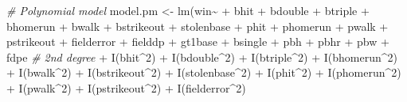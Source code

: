 \documentclass[
]{article}
\newenvironment{Shaded}{\begin{snugshade}}{\end{snugshade}}
\newcommand{\CommentTok}[1]{\textcolor[rgb]{0.56,0.35,0.01}{\textit{#1}}}
\newcommand{\DecValTok}[1]{\textcolor[rgb]{0.00,0.00,0.81}{#1}}
\newcommand{\FunctionTok}[1]{\textcolor[rgb]{0.00,0.00,0.00}{#1}}
\newcommand{\NormalTok}[1]{#1}
\newcommand{\OtherTok}[1]{\textcolor[rgb]{0.56,0.35,0.01}{#1}}
\newcommand{\SpecialCharTok}[1]{\textcolor[rgb]{0.00,0.00,0.00}{#1}}
\begin{document}
\begin{Shaded}
\begin{Highlighting}[]
\CommentTok{\# Polynomial model}
\NormalTok{model.pm }\OtherTok{\textless{}{-}} \FunctionTok{lm}\NormalTok{(win}\SpecialCharTok{\textasciitilde{}} 
               \SpecialCharTok{+}\NormalTok{ bhit}
               \SpecialCharTok{+}\NormalTok{ bdouble }
               \SpecialCharTok{+}\NormalTok{ btriple }
               \SpecialCharTok{+}\NormalTok{ bhomerun }
               \SpecialCharTok{+}\NormalTok{ bwalk }
               \SpecialCharTok{+}\NormalTok{ bstrikeout }
               \SpecialCharTok{+}\NormalTok{ stolenbase }
               \SpecialCharTok{+}\NormalTok{ phit }
               \SpecialCharTok{+}\NormalTok{ phomerun }
               \SpecialCharTok{+}\NormalTok{ pwalk }
               \SpecialCharTok{+}\NormalTok{ pstrikeout }
               \SpecialCharTok{+}\NormalTok{ fielderror }
               \SpecialCharTok{+}\NormalTok{ fielddp }
               \SpecialCharTok{+}\NormalTok{ gt1base }
               \SpecialCharTok{+}\NormalTok{ bsingle }
               \SpecialCharTok{+}\NormalTok{ pbh }
               \SpecialCharTok{+}\NormalTok{ pbhr }
               \SpecialCharTok{+}\NormalTok{ pbw }
               \SpecialCharTok{+}\NormalTok{ fdpe }
               \CommentTok{\# 2nd degree}
               \SpecialCharTok{+} \FunctionTok{I}\NormalTok{(bhit}\SpecialCharTok{\^{}}\DecValTok{2}\NormalTok{)}
               \SpecialCharTok{+} \FunctionTok{I}\NormalTok{(bdouble}\SpecialCharTok{\^{}}\DecValTok{2}\NormalTok{) }
               \SpecialCharTok{+} \FunctionTok{I}\NormalTok{(btriple}\SpecialCharTok{\^{}}\DecValTok{2}\NormalTok{) }
               \SpecialCharTok{+} \FunctionTok{I}\NormalTok{(bhomerun}\SpecialCharTok{\^{}}\DecValTok{2}\NormalTok{) }
               \SpecialCharTok{+} \FunctionTok{I}\NormalTok{(bwalk}\SpecialCharTok{\^{}}\DecValTok{2}\NormalTok{) }
               \SpecialCharTok{+} \FunctionTok{I}\NormalTok{(bstrikeout}\SpecialCharTok{\^{}}\DecValTok{2}\NormalTok{) }
               \SpecialCharTok{+} \FunctionTok{I}\NormalTok{(stolenbase}\SpecialCharTok{\^{}}\DecValTok{2}\NormalTok{) }
               \SpecialCharTok{+} \FunctionTok{I}\NormalTok{(phit}\SpecialCharTok{\^{}}\DecValTok{2}\NormalTok{) }
               \SpecialCharTok{+} \FunctionTok{I}\NormalTok{(phomerun}\SpecialCharTok{\^{}}\DecValTok{2}\NormalTok{) }
               \SpecialCharTok{+} \FunctionTok{I}\NormalTok{(pwalk}\SpecialCharTok{\^{}}\DecValTok{2}\NormalTok{) }
               \SpecialCharTok{+} \FunctionTok{I}\NormalTok{(pstrikeout}\SpecialCharTok{\^{}}\DecValTok{2}\NormalTok{) }
               \SpecialCharTok{+} \FunctionTok{I}\NormalTok{(fielderror}\SpecialCharTok{\^{}}\DecValTok{2}\NormalTok{) }

\end{Highlighting}
\end{Shaded}
\end{document}
